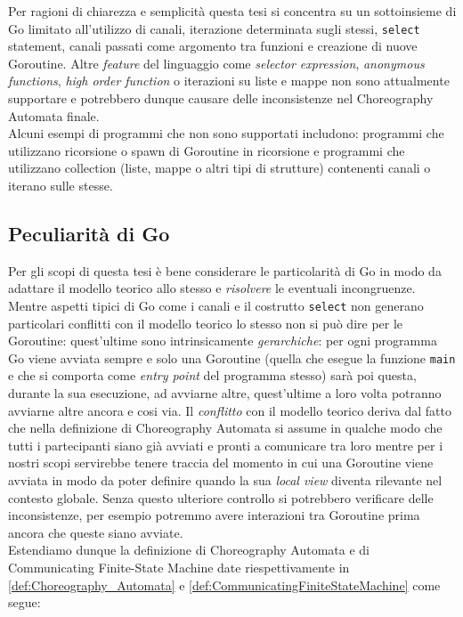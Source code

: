 Per ragioni di chiarezza e semplicità questa tesi si concentra su un sottoinsieme di Go limitato all'utilizzo di canali, iterazione determinata sugli stessi, \texttt{select} statement, canali passati come argomento tra funzioni e creazione di nuove Goroutine. Altre \emph{feature} del linguaggio come \emph{selector expression}, \emph{anonymous functions}, \emph{high order function} o iterazioni su liste e mappe non sono attualmente supportare e potrebbero dunque causare delle inconsistenze nel Choreography Automata finale. \\
Alcuni esempi di programmi che non sono supportati includono: programmi che utilizzano ricorsione o spawn di Goroutine in ricorsione e programmi che utilizzano collection (liste, mappe o altri tipi di strutture) contenenti canali o iterano sulle stesse. \\

\subsection{Peculiarità di Go}
Per gli scopi di questa tesi è bene considerare le particolarità di Go in modo da adattare il modello teorico allo stesso e \emph{risolvere} le eventuali incongruenze.\bigskip \\
Mentre aspetti tipici di Go come i canali e il costrutto \texttt{select} non generano particolari conflitti con il modello teorico lo stesso non si può dire per le Goroutine: quest'ultime sono intrinsicamente \emph{gerarchiche}: per ogni programma Go viene avviata sempre e solo una Goroutine (quella che esegue la funzione \texttt{main} e che si comporta come \emph{entry point} del programma stesso) sarà poi questa, durante la sua esecuzione, ad avviarne altre, quest'ultime a loro volta potranno avviarne altre ancora e cosi via.
Il \emph{conflitto} con il modello teorico deriva dal fatto che nella definizione di Choreography Automata si assume in qualche modo che tutti i partecipanti siano già avviati e pronti a comunicare tra loro mentre per i nostri scopi servirebbe tenere traccia del momento in cui una Goroutine viene avviata in modo da poter definire quando la sua \emph{local view} diventa rilevante nel contesto globale. Senza questo ulteriore controllo si potrebbero verificare delle inconsistenze, per esempio potremmo avere interazioni tra Goroutine prima ancora che queste siano avviate.\bigskip \\
Estendiamo dunque la definizione di Choreography Automata e di Communicating Finite-State Machine date riespettivamente in \ref{def:Choreography_Automata} e \ref{def:CommunicatingFiniteStateMachine} come segue:

